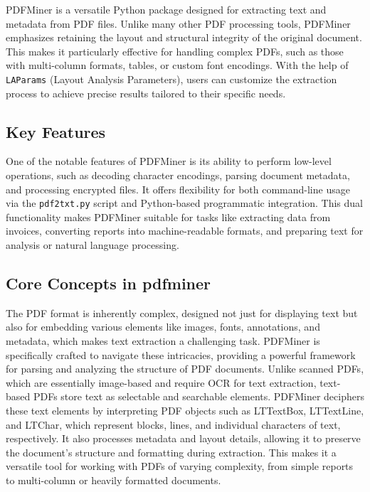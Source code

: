 PDFMiner is a versatile Python package designed for extracting text and metadata from PDF files. Unlike many other PDF processing tools, PDFMiner emphasizes retaining the layout and structural integrity of the original document. This makes it particularly effective for handling complex PDFs, such as those with multi-column formats, tables, or custom font encodings. With the help of \texttt{LAParams} (Layout Analysis Parameters), users can customize the extraction process to achieve precise results tailored to their specific needs.\cite{MB20261:2023}

\subsection{Key Features}

One of the notable features of PDFMiner is its ability to perform low-level operations, such as decoding character encodings, parsing document metadata, and processing encrypted files. It offers flexibility for both command-line usage via the \texttt{pdf2txt.py} script and Python-based programmatic integration. This dual functionality makes PDFMiner suitable for tasks like extracting data from invoices, converting reports into machine-readable formats, and preparing text for analysis or natural language processing.\cite{MB20261:2023}

\subsection{Core Concepts in pdfminer}

The PDF format is inherently complex, designed not just for displaying text but also for embedding various elements like images, fonts, annotations, and metadata, which makes text extraction a challenging task. PDFMiner is specifically crafted to navigate these intricacies, providing a powerful framework for parsing and analyzing the structure of PDF documents. Unlike scanned PDFs, which are essentially image-based and require OCR for text extraction, text-based PDFs store text as selectable and searchable elements. PDFMiner deciphers these text elements by interpreting PDF objects such as LTTextBox, LTTextLine, and LTChar, which represent blocks, lines, and individual characters of text, respectively. It also processes metadata and layout details, allowing it to preserve the document's structure and formatting during extraction. This makes it a versatile tool for working with PDFs of varying complexity, from simple reports to multi-column or heavily formatted documents.

